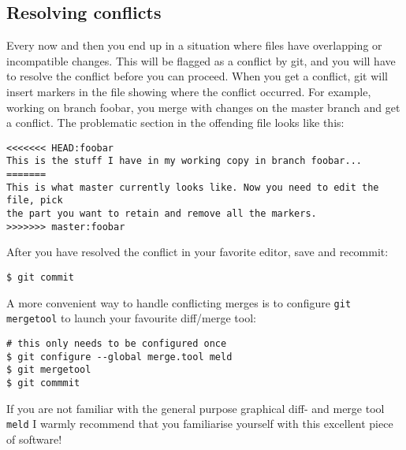 \documentclass[a4paper,10pt]{article}
\begin{document}
\subsection{Resolving conflicts}
\label{sec:conflict}
Every now and then you end up in a situation where files have overlapping or
incompatible changes. This will be flagged as a conflict by git, and you will
have to resolve the conflict before you can proceed. When you get a conflict,
git will insert markers in the file showing where the conflict occurred. For
example, working on branch foobar, you merge with changes on the master branch
and get a conflict. The problematic section in the offending file looks like
this:
\begin{verbatim}
<<<<<<< HEAD:foobar
This is the stuff I have in my working copy in branch foobar...
=======
This is what master currently looks like. Now you need to edit the file, pick
the part you want to retain and remove all the markers.
>>>>>>> master:foobar
\end{verbatim}
After you have resolved the conflict in your favorite editor, save and
recommit:
\begin{verbatim}
$ git commit
\end{verbatim}
A more convenient way to handle conflicting merges is to configure
\texttt{git mergetool} to launch your favourite diff/merge tool:
\begin{verbatim}
# this only needs to be configured once
$ git configure --global merge.tool meld
$ git mergetool
$ git commmit
\end{verbatim}
If you are not familiar with the general purpose graphical diff- and merge
tool \texttt{meld} I warmly recommend that you familiarise yourself with this
excellent piece of software!
\end{document}

